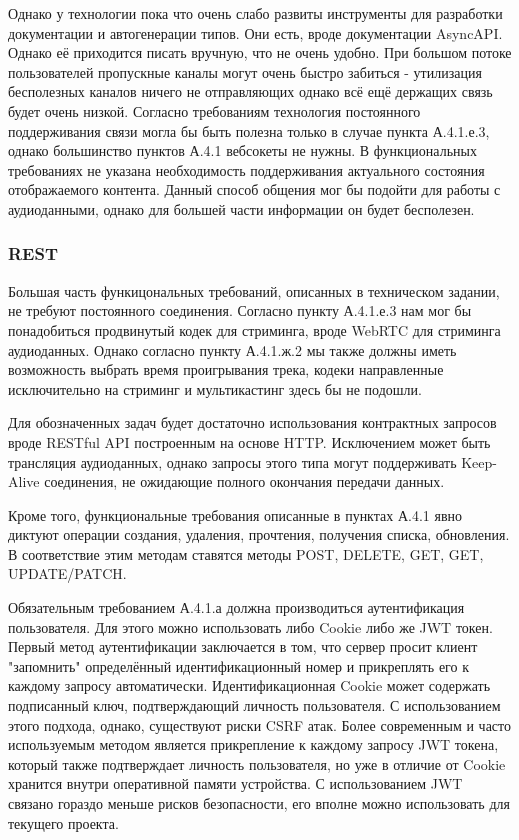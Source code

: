 \documentclass[14pt]{extarticle}
\begin{document}
Однако у технологии пока что очень слабо развиты инструменты для разработки документации и автогенерации типов. Они есть, 
вроде документации AsyncAPI. Однако её приходится писать вручную, что не очень удобно. При большом потоке пользователей
пропускные каналы могут очень быстро забиться - утилизация бесполезных каналов ничего не отправляющих однако всё ещё
держащих связь будет очень низкой. Согласно требованиям технология постоянного поддерживания связи могла бы быть
полезна только в случае пункта А.4.1.е.3, однако большинство пунктов А.4.1 вебсокеты не нужны. В функциональных
требованиях не указана необходимость поддерживания актуального состояния отображаемого контента. Данный способ общения
мог бы подойти для работы с аудиоданными, однако для большей части информации он будет бесполезен.

\subsubsection{REST}

Большая часть функицональных требований, описанных в техническом задании, не требуют постоянного соединения. 
Согласно пункту А.4.1.е.3 нам мог бы понадобиться продвинутый кодек для стриминга, вроде WebRTC для стриминга
аудиоданных. Однако согласно пункту А.4.1.ж.2 мы также должны иметь возможность выбрать время проигрывания трека, 
кодеки направленные исключительно на стриминг и мультикастинг здесь бы не подошли.

Для обозначенных задач будет достаточно использования контрактных запросов вроде RESTful API построенным на 
основе HTTP. Исключением может быть трансляция аудиоданных, однако запросы этого типа могут поддерживать Keep-Alive
соединения, не ожидающие полного окончания передачи данных.

Кроме того, функциональные требования описанные в пунктах А.4.1 явно диктуют операции создания, удаления, прочтения, 
получения списка, обновления. В соответствие этим методам ставятся методы POST, DELETE, GET, GET, UPDATE/PATCH. 

Обязательным требованием А.4.1.а должна производиться аутентификация пользователя. Для этого можно использовать либо
Cookie либо же JWT токен. Первый метод аутентификации заключается в том, что сервер просит клиент "запомнить" определённый
идентификационный номер и прикреплять его к каждому запросу автоматически. Идентификационная Cookie может содержать 
подписанный ключ, подтверждающий личность пользователя. С использованием этого подхода, однако, существуют риски 
CSRF атак. Более современным и часто используемым методом является прикрепление к каждому запросу JWT токена, который 
также подтверждает личность пользователя, но уже в отличие от Cookie хранится внутри оперативной памяти устройства.
С использованием JWT связано гораздо меньше рисков безопасности, его вполне можно использовать для текущего проекта.
\end{document}

